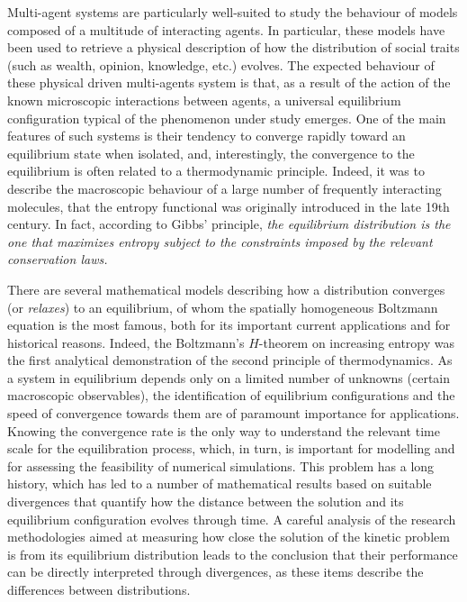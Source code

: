 \documentclass{article}
\begin{document}
%
% 

% 
Multi-agent systems are particularly well-suited to study the behaviour of models composed of a multitude of interacting agents. 
% 
In particular, these models have been used to retrieve a physical description of how the distribution of social traits (such as wealth, opinion, knowledge, etc.) evolves.\cite{YR,CFL,NPT,Sin,PT13,Chak,Chak1,Sen} 
% 
The expected behaviour of these physical driven multi-agents system is that, as a result of the action of the known microscopic interactions between agents, a universal equilibrium configuration typical of the phenomenon under study emerges.
% 
One of the main features of such systems is their tendency to converge rapidly toward an equilibrium state when isolated, and, interestingly, the convergence to the equilibrium is often related to a thermodynamic principle.
% 
Indeed, it was to describe the macroscopic behaviour of a large number of frequently interacting molecules, that the entropy functional was originally introduced in the late 19th century.
%
In fact, according to Gibbs' principle, \emph{the equilibrium distribution is the one that maximizes entropy subject to the constraints imposed by the relevant conservation laws.}
% 

% 
There are several mathematical models describing how a distribution converges (or \textit{relaxes}) to an equilibrium, of whom the spatially homogeneous Boltzmann equation is the most famous, both for its important current applications and for historical reasons.\cite{Bol} 
% 
Indeed, the Boltzmann's $H$-theorem on increasing entropy was the first analytical demonstration of the second principle of thermodynamics.
% 
As a system in equilibrium depends only on a limited number of unknowns (certain macroscopic observables), the identification of equilibrium configurations and the speed of convergence towards them are of paramount importance for applications.
% 
Knowing the convergence rate is the only way to understand the relevant time scale for the equilibration process, which, in turn, is important for modelling and for assessing the feasibility of numerical simulations. 
% 
This problem has a long history, which has led to a number of mathematical results based on suitable divergences that quantify how the distance between the solution and its equilibrium configuration evolves through time.\cite{AA} 
% 
A careful analysis of the research methodologies aimed at measuring how close the solution of the kinetic problem is from its equilibrium distribution leads to the conclusion that their performance can be directly interpreted through divergences, as these items describe the differences between distributions. 
% 
\end{document}
